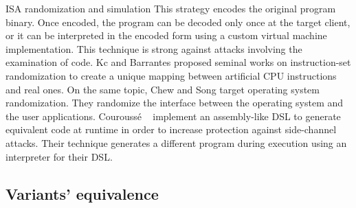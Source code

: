 \begin{strategy}{ISA randomization and simulation}
    \label{strategy:S5}
    \normalfont
    This strategy encodes the original program binary. Once encoded, the program can be decoded only once at the target client, or it can be interpreted in the encoded form using a custom virtual machine implementation. This technique is strong against attacks involving the examination of code. 
    Kc \etal \cite{Kc03} and Barrantes \etal \cite{barrantes2003randomized} proposed seminal works on instruction-set randomization 
    to create a unique mapping between artificial CPU instructions and real ones.
    On the same topic, Chew and Song \cite{Chew02mitigatingbuffer} target operating system randomization. They randomize the interface between the operating system and the user applications.
    Courouss{\'e} \etal~\cite{courousse2016runtime} implement an assembly-like DSL to generate equivalent code at runtime in order to increase protection against side-channel attacks. Their technique generates a different program during execution using an interpreter for their DSL.

    
\end{strategy}

 


\subsection*{Variants' equivalence}

